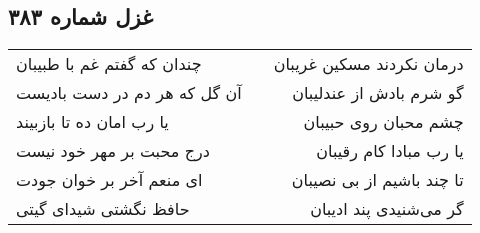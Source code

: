 \begin{center}
\section*{غزل شماره ۳۸۳}
\label{sec:sh383}
\begin{longtable}{l p{0.5cm} r}
چندان که گفتم غم با طبیبان
&&
درمان نکردند مسکین غریبان
\\
آن گل که هر دم در دست بادیست
&&
گو شرم بادش از عندلیبان
\\
یا رب امان ده تا بازبیند
&&
چشم محبان روی حبیبان
\\
درج محبت بر مهر خود نیست
&&
یا رب مبادا کام رقیبان
\\
ای منعم آخر بر خوان جودت
&&
تا چند باشیم از بی نصیبان
\\
حافظ نگشتی شیدای گیتی
&&
گر می‌شنیدی پند ادیبان
\\
\end{longtable}
\end{center}
